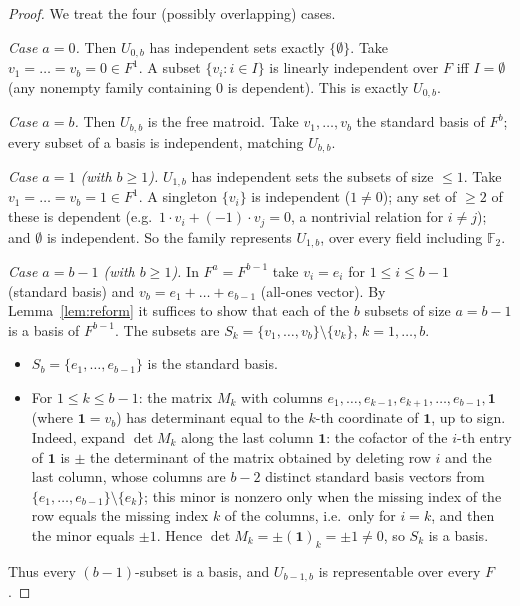 \documentclass{amsart}
\theoremstyle{definition}
\begin{document}
\begin{proof}
We treat the four (possibly overlapping) cases.

\emph{Case $a=0$.} Then $U_{0,b}$ has independent sets exactly $\{\emptyset\}$.
Take $v_1=\dots=v_b=0\in F^1$. A subset $\{v_i:i\in I\}$ is linearly independent
over $F$ iff $I=\emptyset$ (any nonempty family containing $0$ is dependent). This
is exactly $U_{0,b}$.

\emph{Case $a=b$.} Then $U_{b,b}$ is the free matroid. Take $v_1,\dots,v_b$ the
standard basis of $F^b$; every subset of a basis is independent, matching
$U_{b,b}$.

\emph{Case $a=1$ (with $b\ge1$).} $U_{1,b}$ has independent sets the subsets of
size $\le1$. Take $v_1=\dots=v_b=1\in F^1$. A singleton $\{v_i\}$ is independent
($1\ne0$); any set of $\ge2$ of these is dependent (e.g.\
$1\cdot v_i+(-1)\cdot v_j=0$, a nontrivial relation for $i\ne j$); and
$\emptyset$ is independent. So the family represents $U_{1,b}$, over every field
including $\mathbb F_2$.

\emph{Case $a=b-1$ (with $b\ge1$).} In $F^{a}=F^{b-1}$ take $v_i=e_i$ for
$1\le i\le b-1$ (standard basis) and $v_b=e_1+\dots+e_{b-1}$ (all-ones vector). By
Lemma~\ref{lem:reform} it suffices to show that each of the $b$ subsets of size
$a=b-1$ is a basis of $F^{b-1}$. The subsets are $S_k=\{v_1,\dots,v_b\}\setminus
\{v_k\}$, $k=1,\dots,b$.
\begin{itemize}
\item $S_b=\{e_1,\dots,e_{b-1}\}$ is the standard basis.
\item For $1\le k\le b-1$: the matrix $M_k$ with columns $e_1,\dots,e_{k-1},
e_{k+1},\dots,e_{b-1},\mathbf 1$ (where $\mathbf 1=v_b$) has determinant equal to
the $k$-th coordinate of $\mathbf 1$, up to sign. Indeed, expand $\det M_k$ along
the last column $\mathbf 1$: the cofactor of the $i$-th entry of $\mathbf 1$ is
$\pm$ the determinant of the matrix obtained by deleting row $i$ and the last
column, whose columns are $b-2$ distinct standard basis vectors from
$\{e_1,\dots,e_{b-1}\}\setminus\{e_k\}$; this minor is nonzero only when the
missing index of the row equals the missing index $k$ of the columns, i.e.\ only
for $i=k$, and then the minor equals $\pm1$. Hence $\det M_k=\pm(\mathbf 1)_k=\pm
1\ne0$, so $S_k$ is a basis.
\end{itemize}
Thus every $(b-1)$-subset is a basis, and $U_{b-1,b}$ is representable over every
$F$.
\end{proof}
\end{document}
